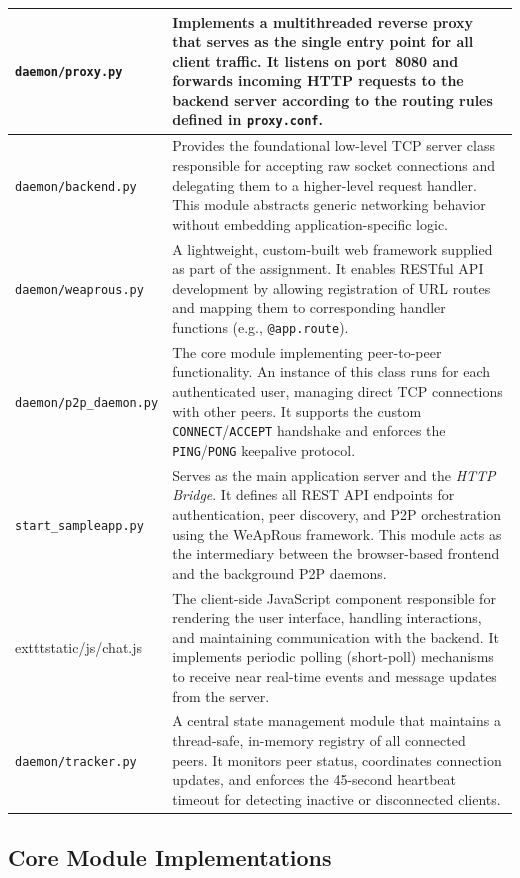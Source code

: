 \begin{longtable}{|p{4cm}|p{10cm}|}
\texttt{daemon/proxy.py} & Implements a multithreaded reverse proxy that serves as the single entry point for all client traffic. 
It listens on port~8080 and forwards incoming HTTP requests to the backend server according to the routing rules defined in \texttt{proxy.conf}. \\ 
\hline
\texttt{daemon/backend.py} & Provides the foundational low-level TCP server class responsible for accepting raw socket connections and delegating them to a higher-level request handler. 
This module abstracts generic networking behavior without embedding application-specific logic. \\ 
\hline
\texttt{daemon/weaprous.py} & A lightweight, custom-built web framework supplied as part of the assignment. 
It enables RESTful API development by allowing registration of URL routes and mapping them to corresponding handler functions (e.g., \texttt{@app.route}). \\ 
\hline
\texttt{daemon/p2p\_daemon.py} & The core module implementing peer-to-peer functionality. 
An instance of this class runs for each authenticated user, managing direct TCP connections with other peers. 
It supports the custom \texttt{CONNECT}/\texttt{ACCEPT} handshake and enforces the \texttt{PING}/\texttt{PONG} keepalive protocol. \\ 
\hline
\texttt{start\_sampleapp.py} & Serves as the main application server and the \textit{HTTP Bridge}. 
It defines all REST API endpoints for authentication, peer discovery, and P2P orchestration using the WeApRous framework. 
This module acts as the intermediary between the browser-based frontend and the background P2P daemons. \\ 
\hline
	exttt{static/js/chat.js} & The client-side JavaScript component responsible for rendering the user interface, handling interactions, and maintaining communication with the backend. 
It implements periodic polling (short-poll) mechanisms to receive near real-time events and message updates from the server. \\
\hline
\texttt{daemon/tracker.py} & A central state management module that maintains a thread-safe, in-memory registry of all connected peers. 
It monitors peer status, coordinates connection updates, and enforces the 45-second heartbeat timeout for detecting inactive or disconnected clients. \\ 

\end{longtable}

\subsection{Core Module Implementations}

